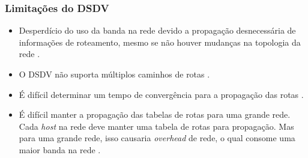 \subsubsection{Limita\c{c}\~ oes do DSDV}
\begin{itemize}
	\item Desperd\'icio do uso da banda na rede devido a propaga\c{c}\~ao desnecess\'aria de informa\c{c}\~oes de roteamento, mesmo se n\~ao houver mudan\c{c}as na topologia da rede \cite{Patel00energyin}.	
	\item O DSDV n\~ao suporta m\'ultiplos caminhos de rotas \cite{gorantala}.
	\item \'E dif\'icil determinar um tempo de converg\^encia para a propaga\c{c}\~ao das rotas \cite{heg}.
	\item \'E dif\'icil manter a propaga\c{c}\~ao das tabelas de rotas para uma grande rede. Cada \textit{host} na rede deve manter uma tabela de rotas para propaga\c{c}\~ao. Mas para uma grande rede, isso causaria \textit{overhead} de rede, o qual consome uma maior banda na rede \cite{gorantala}.
\end{itemize}
